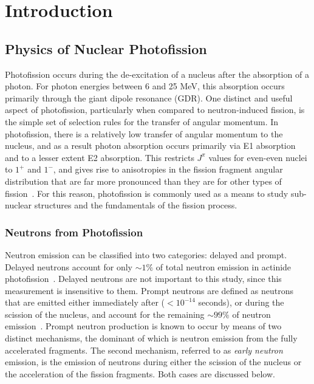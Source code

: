\chapter{Introduction}
\section{Physics of Nuclear Photofission}
Photofission occurs during the de-excitation of a nucleus after the absorption of a photon.
For photon energies between 6 and 25 MeV, this absorption occurs primarily through the giant dipole resonance (GDR).
One distinct and useful aspect of photofission, particularly when compared to neutron-induced fission, is the simple set of selection rules for the transfer of angular momentum.
In photofission, there is a relatively low transfer of angular momentum to the nucleus, and as a result photon absorption occurs primarily via E1 absorption and to a lesser extent E2 absorption.
This restricts $J^{\pi}$ values for even-even nuclei to $1^{+}$ and $1^{-}$, and gives rise to anisotropies in the fission fragment angular distribution that are far more pronounced than they are for other types of fission~\cite{1977FragAss}.
For this reason, photofission is commonly used as a means to study sub-nuclear structures and the fundamentals of the fission process.

\subsection{Neutrons from Photofission}
Neutron emission can be classified into two categories: delayed and prompt.
Delayed neutrons account for only $\sim1\%$ of total neutron emission in actinide photofission~\cite{Caldwell2017DelayedNs}.
Delayed neutrons are not important to this study, since this measurement is insensitive to them.
Prompt neutrons are defined as neutrons that are emitted either immediately after ($<10^{-14}$ seconds), or during the scission of the nucleus, and account for the remaining $\sim99\%$ of neutron emission~\cite{Caldwell2017DelayedNs}.
Prompt neutron production is known to occur by means of two distinct mechanisms, the dominant of which is neutron emission from the fully accelerated fragments.
The second mechanism, referred to as \textit{early neutron} emission, is the emission of neutrons during either the scission of the nucleus or the acceleration of the fission fragments.
Both cases are discussed below.

